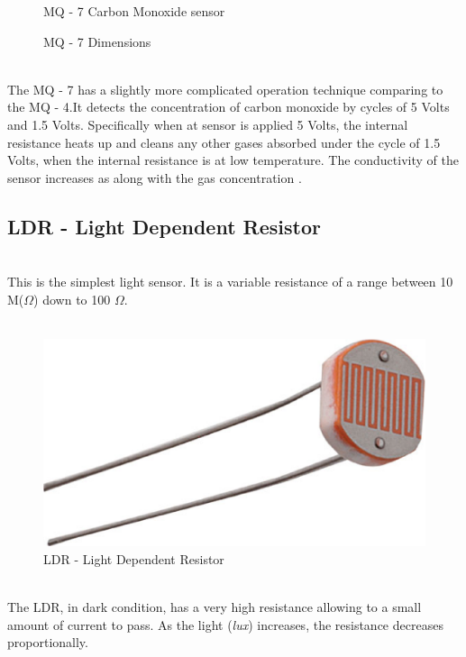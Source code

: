 \documentclass[12pt,a4paper,draft]{report}
\begin{document}
\begin{figure}[H]
\caption{MQ - 7 Carbon Monoxide  sensor}
\caption{MQ - 7 Dimensions}
\end{figure}
\ \\
The MQ - 7 has a slightly more complicated operation technique comparing to the MQ - 4.It detects the concentration of carbon monoxide by cycles of 5 Volts and 1.5 Volts. Specifically when at sensor is applied 5 Volts, the internal resistance heats up and cleans any other gases absorbed under the cycle of 1.5 Volts, when the internal resistance is at low temperature. 
The conductivity of the sensor increases as along with the gas concentration \cite{website:mq7_datasheet}. %
\ \\
%
\subsection{LDR - Light Dependent Resistor}
\ \\
This is the simplest light sensor. It is a variable resistance of a range between 10 M($\Omega$) down to 100 $\Omega$.
\\ \
\begin{figure}[H]
\centering
\includegraphics*[scale=0.2]{ldr}
\caption{LDR - Light Dependent Resistor}
\end{figure}
\ \\
The LDR, in dark condition, has a very high resistance allowing to a small amount of current to pass. As the light (\textit{lux}) increases, the resistance decreases proportionally.
\ \\
%
\end{document}
